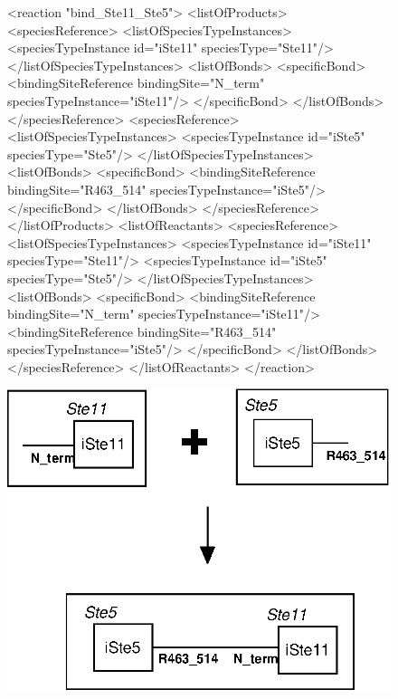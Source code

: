 \documentclass{cekarticle}
\begin{document}
\begin{figure}[h]
\begin{example}
<reaction "bind_Ste11_Ste5">
    <listOfProducts>
        <speciesReference>
            <listOfSpeciesTypeInstances>
                <speciesTypeInstance id="iSte11" speciesType="Ste11"/>
            </listOfSpeciesTypeInstances>
            <listOfBonds>
                <specificBond>
                    <bindingSiteReference bindingSite="N_term" speciesTypeInstance="iSte11"/>
                </specificBond>
            </listOfBonds>
        </speciesReference>
        <speciesReference>
            <listOfSpeciesTypeInstances>
                <speciesTypeInstance id="iSte5" speciesType="Ste5"/>
            </listOfSpeciesTypeInstances>
            <listOfBonds>
                <specificBond>
                    <bindingSiteReference bindingSite="R463_514" speciesTypeInstance="iSte5"/>
                </specificBond>
            </listOfBonds>
        </speciesReference>
    </listOfProducts>
    <listOfReactants>
        <speciesReference>
            <listOfSpeciesTypeInstances>
                <speciesTypeInstance id="iSte11" speciesType="Ste11"/>
                <speciesTypeInstance id="iSte5" speciesType="Ste5"/>
            </listOfSpeciesTypeInstances>
            <listOfBonds>
                <specificBond>
                    <bindingSiteReference bindingSite="N_term" speciesTypeInstance="iSte11"/>
                    <bindingSiteReference bindingSite="R463_514" speciesTypeInstance="iSte5"/>
                </specificBond>
            </listOfBonds>
        </speciesReference>
    </listOfReactants>
</reaction>
\end{example}
  \vspace*{8pt}
  \centering
  \includegraphics[scale = 0.7]{bind_Ste11_Ste5_v2.eps}


\end{figure}
\end{document}
